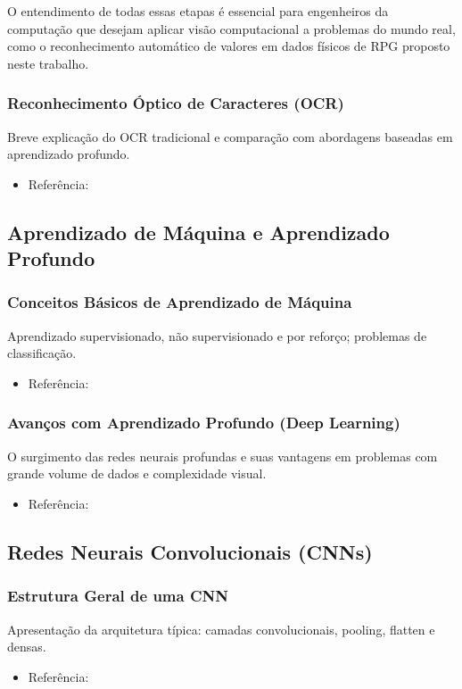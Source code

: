 O entendimento de todas essas etapas é essencial para engenheiros da computação que desejam aplicar visão computacional 
a problemas do mundo real, como o reconhecimento automático de valores em dados físicos de RPG proposto neste trabalho.



\subsubsection{Reconhecimento Óptico de Caracteres (OCR)}
Breve explicação do OCR tradicional e comparação com abordagens baseadas em aprendizado profundo.
\begin{itemize}
    \item Referência: \cite{szeliski2010computer, bishop2006pattern}
\end{itemize}

\subsection{Aprendizado de Máquina e Aprendizado Profundo}

\subsubsection{Conceitos Básicos de Aprendizado de Máquina}
Aprendizado supervisionado, não supervisionado e por reforço; problemas de classificação.
\begin{itemize}
    \item Referência: \cite{bishop2006pattern}
\end{itemize}

\subsubsection{Avanços com Aprendizado Profundo (Deep Learning)}
O surgimento das redes neurais profundas e suas vantagens em problemas com grande volume de dados e 
complexidade visual.
\begin{itemize}
    \item Referência: \cite{goodfellow2016deep}
\end{itemize}

\subsection{Redes Neurais Convolucionais (CNNs)}

\subsubsection{Estrutura Geral de uma CNN}
Apresentação da arquitetura típica: camadas convolucionais, pooling, flatten e densas.
\begin{itemize}
    \item Referência: \cite{lecun1998gradient, goodfellow2016deep}
\end{itemize}

